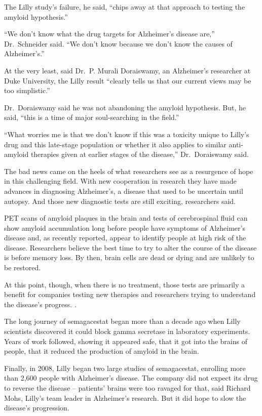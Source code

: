 ﻿\documentclass[12pt]{article}
\begin{document}
The Lilly study's failure, he said, ``chips away at that approach to testing the amyloid
hypothesis.''

``We don't know what the drug targets for Alzheimer's disease are,'' Dr.~Schneider said. ``We don't
know because we don't know the causes of Alzheimer's.''

At the very least, said Dr.~P. Murali Doraiswamy, an Alzheimer's researcher at Duke University, the
Lilly result ``clearly tells us that our current views may be too simplistic.''

Dr.~Doraiswamy said he was not abandoning the amyloid hypothesis. But, he said, ``this is a time of
major soul-searching in the field.''

``What worries me is that we don't know if this was a toxicity unique to Lilly's drug and this
late-stage population or whether it also applies to similar anti-amyloid therapies given at earlier
stages of the disease,'' Dr.~Doraiswamy said.

The bad news came on the heels of what researchers see as a resurgence of hope in this challenging
field. With new cooperation in research they have made advances in diagnosing Alzheimer's, a disease
that used to be uncertain until autopsy. And those new diagnostic tests are still exciting,
researchers said.

PET scans of amyloid plaques in the brain and tests of cerebrospinal fluid can show amyloid
accumulation long before people have symptoms of Alzheimer's disease and, as recently reported,
appear to identify people at high risk of the disease. Researchers believe the best time to try to
alter the course of the disease is before memory loss. By then, brain cells are dead or dying and
are unlikely to be restored.

At this point, though, when there is no treatment, those tests are primarily a benefit for companies
testing new therapies and researchers trying to understand the disease's progress. .

The long journey of semagacestat began more than a decade ago when Lilly scientists discovered it
could block gamma secretase in laboratory experiments. Years of work followed, showing it appeared
safe, that it got into the brains of people, that it reduced the production of amyloid in the brain.

Finally, in 2008, Lilly began two large studies of semagacestat, enrolling more than 2,600 people
with Alzheimer's disease. The company did not expect its drug to reverse the disease -- patients'
brains were too ravaged for that, said Richard Mohs, Lilly's team leader in Alzheimer's research.
But it did hope to slow the disease's progression.
\end{document}
